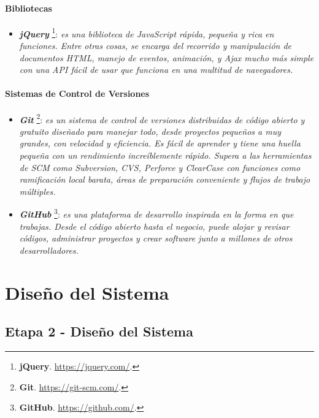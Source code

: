 \documentclass[11pt,oneside]{book}
\begin{document}
\subsubsection{Bibliotecas}
\begin{itemize}
\item \textit{\textbf{jQuery}} \footnote{\textbf{jQuery}. \url{https://jquery.com/}.}: \textit{es una biblioteca de JavaScript rápida, pequeña y rica en funciones. Entre otras cosas, se encarga del recorrido y manipulación de documentos HTML, manejo de eventos, animación, y Ajax mucho más simple con una API fácil de usar que funciona en una multitud de navegadores.}
\end{itemize}

\newpage
\subsubsection{Sistemas de Control de Versiones}
\begin{itemize}
\item \textit{\textbf{Git}} \footnote{\textbf{Git}. \url{https://git-scm.com/}.}: \textit{es un sistema de control de versiones distribuidas de código abierto y gratuito diseñado para manejar todo, desde proyectos pequeños a muy grandes, con velocidad y eficiencia. Es fácil de aprender y tiene una huella pequeña con un rendimiento increíblemente rápido. Supera a las herramientas de SCM como Subversion, CVS, Perforce y ClearCase con funciones como ramificación local barata, áreas de preparación conveniente y flujos de trabajo múltiples.}

\item \textit{\textbf{GitHub}} \footnote{\textbf{GitHub}. \url{https://github.com/}.}: \textit{es una plataforma de desarrollo inspirada en la forma en que trabajas. Desde el código abierto hasta el negocio, puede alojar y revisar códigos, administrar proyectos y crear software junto a millones de otros desarrolladores.}
\end{itemize}

\clearpage
\newpage
\chapter{Diseño del Sistema}

\section{Etapa 2 - Diseño del Sistema} \label{capitulo2}
\end{document}
